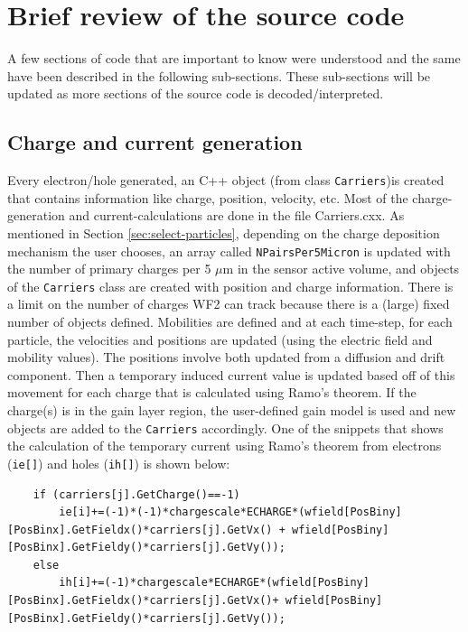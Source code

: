 \documentclass[11pt]{article}
\begin{document}
\section{Brief review of the source code}

A few sections of code that are important to know were understood and the same have been described in the following sub-sections. These sub-sections will be updated as more sections of the source code is decoded/interpreted.

\subsection{Charge and current generation}
Every electron/hole generated, an C++ object (from class \texttt{Carriers})is created that contains information like charge, position, velocity, etc. Most of the charge-generation and current-calculations are done in the file Carriers.cxx. As mentioned in Section \ref{sec:select-particles}, depending on the charge deposition mechanism the user chooses, an array called \texttt{NPairsPer5Micron} is updated with the number of primary charges per 5 $\mu$m in the sensor active volume, and objects of the \texttt{Carriers} class are created with position and charge information. There is a limit on the number of charges WF2 can track because there is a (large) fixed number of objects defined. 
\newline Mobilities are defined and at each time-step, for each particle, the velocities and positions are updated (using the electric field and mobility values). The positions involve both updated from a diffusion and drift component. Then a temporary induced current value is updated based off of this movement for each charge that is calculated using Ramo's theorem. If the charge(s) is in the gain layer region, the user-defined gain model is used and new objects are added to the \texttt{Carriers} accordingly. One of the snippets that shows the calculation of the temporary current using Ramo's theorem from electrons (\texttt{ie[]}) and holes (\texttt{ih[]}) is shown below:
\begin{lstlisting}
    if (carriers[j].GetCharge()==-1)
        ie[i]+=(-1)*(-1)*chargescale*ECHARGE*(wfield[PosBiny][PosBinx].GetFieldx()*carriers[j].GetVx() + wfield[PosBiny][PosBinx].GetFieldy()*carriers[j].GetVy());   
	else
		ih[i]+=(-1)*chargescale*ECHARGE*(wfield[PosBiny][PosBinx].GetFieldx()*carriers[j].GetVx()+ wfield[PosBiny][PosBinx].GetFieldy()*carriers[j].GetVy());
\end{lstlisting}
\end{document}
